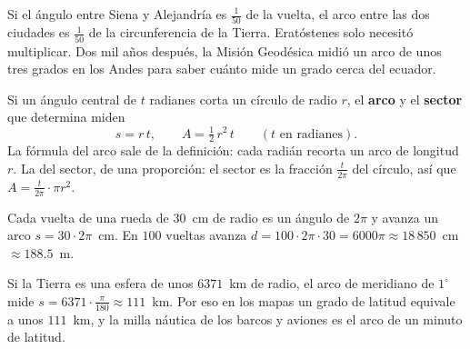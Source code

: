 \documentclass[11pt]{article}
\begin{document}
\label{tema:arcosector}

\begin{hilo}
Si el ángulo entre Siena y Alejandría es $\frac{1}{50}$ de la vuelta, el arco
entre las dos ciudades es $\frac{1}{50}$ de la circunferencia de la Tierra.
Eratóstenes solo necesitó multiplicar. Dos mil años después, la Misión Geodésica
midió un arco de unos tres grados en los Andes para saber cuánto mide un grado
cerca del ecuador.
\end{hilo}

Si un ángulo central de $t$ radianes corta un círculo de radio $r$, el
\textbf{arco} y el \textbf{sector} que determina miden
\[
  s = r\,t, \qquad A = \tfrac{1}{2}\,r^2\,t \qquad (t \text{ en radianes}).
\]
La fórmula del arco sale de la definición: cada radián recorta un arco de
longitud $r$. La del sector, de una proporción: el sector es la fracción
$\frac{t}{2\pi}$ del círculo, así que $A = \frac{t}{2\pi}\cdot\pi r^2$.

\begin{center}
\end{center}

\begin{ejemplo}
Cada vuelta de una rueda de $30$~cm de radio es un ángulo de $2\pi$ y avanza un
arco $s = 30 \cdot 2\pi$~cm. En $100$ vueltas avanza
$d = 100 \cdot 2\pi \cdot 30 = 6000\pi \approx 18\,850$~cm $\approx \num{188,5}$~m.
\end{ejemplo}

\begin{aplicacion}
Si la Tierra es una esfera de unos $6371$~km de radio, el arco de meridiano de
$1^\circ$ mide $s = 6371 \cdot \frac{\pi}{180} \approx 111$~km. Por eso en los mapas
un grado de latitud equivale a unos $111$~km, y la milla náutica de los barcos y
aviones es el arco de un minuto de latitud.
\end{aplicacion}
\end{document}
